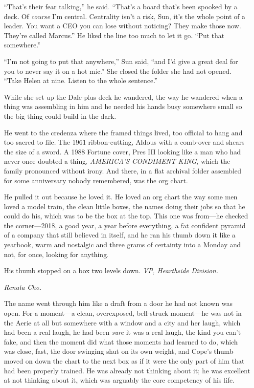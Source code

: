 \documentclass[11pt,openany]{book}
\newcommand{\scenebreak}{\par\vspace{0.5\baselineskip}\begin{center}\textasteriskcentered\quad\textasteriskcentered\quad\textasteriskcentered\end{center}\vspace{0.5\baselineskip}\par}
\begin{document}
``That's their fear talking,'' he said. ``That's a board that's been spooked by a deck. Of \textit{course} I'm central. Centrality isn't a risk, Sun, it's the whole point of a leader. You want a CEO you can lose without noticing? They make those now. They're called Marcus.'' He liked the line too much to let it go. ``Put that somewhere.''

``I'm not going to put that anywhere,'' Sun said, ``and I'd give a great deal for you to never say it on a hot mic.'' She closed the folder she had not opened. ``Take Helen at nine. Listen to the whole sentence.''


\scenebreak


While she set up the Dale-plus deck he wandered, the way he wandered when a thing was assembling in him and he needed his hands busy somewhere small so the big thing could build in the dark.

He went to the credenza where the framed things lived, too official to hang and too sacred to file. The 1961 ribbon-cutting, Aldous with a comb-over and shears the size of a sword. A 1988 Fortune cover, Pres III looking like a man who had never once doubted a thing, \textit{AMERICA'S CONDIMENT KING,} which the family pronounced without irony. And there, in a flat archival folder assembled for some anniversary nobody remembered, was the org chart.

He pulled it out because he loved it. He loved an org chart the way some men loved a model train, the clean little boxes, the names doing their jobs so that he could do his, which was to be the box at the top. This one was from---he checked the corner---2018, a good year, a year before everything, a fat confident pyramid of a company that still believed in itself, and he ran his thumb down it like a yearbook, warm and nostalgic and three grams of certainty into a Monday and not, for once, looking for anything.

His thumb stopped on a box two levels down. \textit{VP, Hearthside Division.}

\textit{Renata Cho.}

The name went through him like a draft from a door he had not known was open. For a moment---a clean, overexposed, bell-struck moment---he was not in the Aerie at all but somewhere with a window and a city and her laugh, which had been a real laugh, he had been \textit{sure} it was a real laugh, the kind you can't fake, and then the moment did what those moments had learned to do, which was close, fast, the door swinging shut on its own weight, and Cope's thumb moved on down the chart to the next box as if it were the only part of him that had been properly trained. He was already not thinking about it; he was excellent at not thinking about it, which was arguably the core competency of his life.
\end{document}
